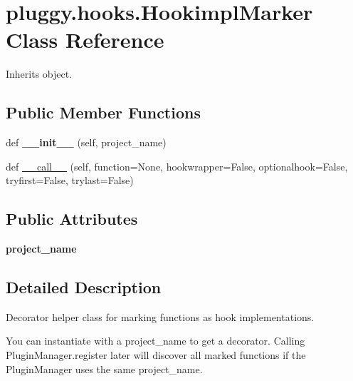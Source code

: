 \hypertarget{classpluggy_1_1hooks_1_1_hookimpl_marker}{}\section{pluggy.\+hooks.\+Hookimpl\+Marker Class Reference}
\label{classpluggy_1_1hooks_1_1_hookimpl_marker}


Inherits object.

\subsection*{Public Member Functions}
\begin{DoxyCompactItemize}
\item 
\mbox{\label{classpluggy_1_1hooks_1_1_hookimpl_marker_a9fd5436a0b4b87c27706c6227e1dbc86}} 
def {\bfseries \+\_\+\+\_\+init\+\_\+\+\_\+} (self, project\+\_\+name)
\item 
def \hyperlink{classpluggy_1_1hooks_1_1_hookimpl_marker_a1ea05e056abe8433e2762497b0b7a629}{\+\_\+\+\_\+call\+\_\+\+\_\+} (self, function=None, hookwrapper=False, optionalhook=False, tryfirst=False, trylast=False)
\end{DoxyCompactItemize}
\subsection*{Public Attributes}
\begin{DoxyCompactItemize}
\item 
\mbox{\label{classpluggy_1_1hooks_1_1_hookimpl_marker_a9caea8a81d4843b411382b26c77256d8}} 
{\bfseries project\+\_\+name}
\end{DoxyCompactItemize}


\subsection{Detailed Description}
\begin{DoxyVerb}Decorator helper class for marking functions as hook implementations.

You can instantiate with a project_name to get a decorator.
Calling PluginManager.register later will discover all marked functions
if the PluginManager uses the same project_name.
\end{DoxyVerb}
 

